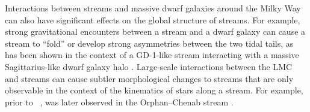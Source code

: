 \documentclass[final,5p,times,twocolumn,authoryear]{elsarticle}
\begin{document}
Interactions between streams and massive dwarf galaxies around the Milky Way can also
have significant effects on the global structure of streams.
For example, strong gravitational encounters between a stream and a dwarf galaxy can
cause a stream to ``fold'' or develop strong asymmetries between the two tidal tails, as
has been shown in the context of a GD-1-like stream interacting with a massive
Sagittarius-like dwarf galaxy halo \citep{dillamore:2022}.
Large-scale interactions between the LMC and streams can cause subtler morphological
changes to streams that are only observable in the context of the kinematics of stars
along a stream.
For example, prior to \gaia\ , 
 was later observed in  the Orphan--Chenab stream
\citep{koposov:2019, erkal:2019}.
\end{document}
